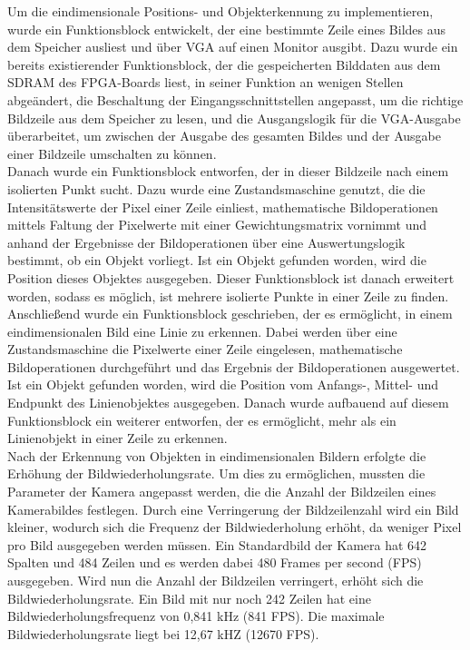 \documentclass[ngerman,12pt]{article} %
\begin{document}
{Um die eindimensionale Positions- und Objekterkennung zu implementieren, wurde ein Funktionsblock entwickelt, der eine bestimmte Zeile eines Bildes aus dem Speicher ausliest und über VGA auf einen Monitor ausgibt. Dazu wurde ein bereits existierender Funktionsblock, der die gespeicherten Bilddaten aus dem SDRAM des FPGA-Boards liest, in seiner Funktion an wenigen Stellen abgeändert, die Beschaltung der Eingangsschnittstellen angepasst, um die richtige Bildzeile aus dem Speicher zu lesen, und die Ausgangslogik für die VGA-Ausgabe überarbeitet, um zwischen der Ausgabe des gesamten Bildes und der Ausgabe einer Bildzeile umschalten zu können.\\
Danach wurde ein Funktionsblock entworfen, der in dieser Bildzeile nach einem isolierten Punkt sucht. Dazu wurde eine Zustandsmaschine genutzt, die die Intensitätswerte der Pixel einer Zeile einliest, mathematische Bildoperationen mittels Faltung der Pixelwerte mit einer Gewichtungsmatrix vornimmt und anhand der Ergebnisse der Bildoperationen über eine Auswertungslogik bestimmt, ob ein Objekt vorliegt. Ist ein Objekt gefunden worden, wird die Position dieses Objektes ausgegeben. Dieser Funktionsblock ist danach erweitert worden, sodass es möglich, ist mehrere isolierte Punkte in einer Zeile zu finden.\\
Anschließend wurde ein Funktionsblock geschrieben, der es ermöglicht, in einem eindimensionalen Bild eine Linie zu erkennen. Dabei werden über eine Zustandsmaschine die Pixelwerte einer Zeile eingelesen, mathematische Bildoperationen durchgeführt und das Ergebnis der Bildoperationen ausgewertet. Ist ein Objekt gefunden worden, wird die Position vom Anfangs-, Mittel- und Endpunkt des Linienobjektes ausgegeben. Danach wurde aufbauend auf diesem Funktionsblock ein weiterer entworfen, der es ermöglicht, mehr als ein Linienobjekt in einer Zeile zu erkennen.\\
Nach der Erkennung von Objekten in eindimensionalen Bildern erfolgte die Erhöhung der Bildwiederholungsrate. Um dies zu ermöglichen, mussten die Parameter der Kamera angepasst werden, die die Anzahl der Bildzeilen eines Kamerabildes festlegen. Durch eine Verringerung der Bildzeilenzahl wird ein Bild kleiner, wodurch sich die Frequenz der Bildwiederholung erhöht, da weniger Pixel pro Bild ausgegeben werden müssen. Ein Standardbild der Kamera hat 642 Spalten und 484 Zeilen und es werden dabei 480 Frames per second (FPS) ausgegeben. Wird nun die Anzahl der Bildzeilen verringert, erhöht sich die Bildwiederholungsrate. Ein Bild mit nur noch 242 Zeilen hat eine Bildwiederholungsfrequenz von 0,841 kHz (841 FPS). Die maximale Bildwiederholungsrate liegt bei 12,67 kHZ (12670 FPS).\newline

}
\end{document}
